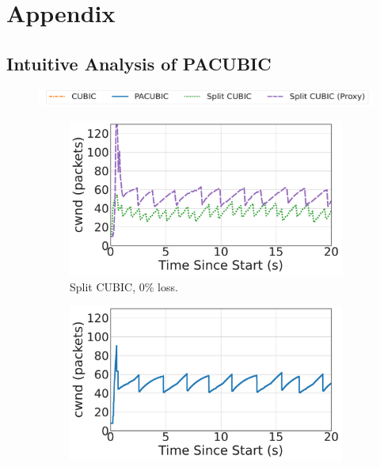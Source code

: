 \chapter{Appendix}

\section{Intuitive Analysis of PACUBIC}
\label{sec:appendix:pacubic}

\begin{figure}[h]
\centering
\includegraphics[width=0.8\linewidth]{sidekick-paper/figures/cwnd/cwnd_legend.pdf}\\
\begin{subfigure}{0.32\linewidth}
	\includegraphics[width=\linewidth]{sidekick-paper/figures/cwnd/cwnd_split_loss0p.pdf}
	\caption{Split CUBIC, 0\% loss.}
	\label{fig:time-cwnd:split-loss0p}
\end{subfigure}
\begin{subfigure}{0.32\linewidth}
	\includegraphics[width=\linewidth]{sidekick-paper/figures/cwnd/cwnd_pacubic_loss0p.pdf}

\end{subfigure}
\end{figure}
